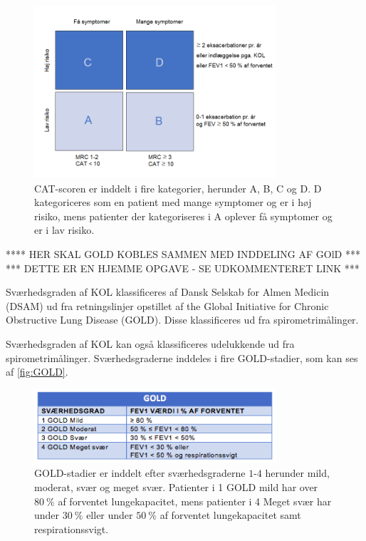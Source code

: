 \begin{figure} [H]
\centering
\includegraphics[width=0.8\textwidth]{figures/CAT}
\caption{CAT-scoren er inddelt i fire kategorier, herunder A, B, C og D. D kategoriceres som en patient med mange symptomer og er i høj risiko, mens patienter der kategoriseres i A oplever få symptomer og er i lav risiko.}
\label{fig:CAT}
\end{figure} 
 
\noindent
**** HER SKAL GOLD KOBLES SAMMEN MED INDDELING AF GOlD ***
*** DETTE ER EN HJEMME OPGAVE - SE UDKOMMENTERET LINK ***

Sværhedsgraden af KOL klassificeres af Dansk Selskab for Almen Medicin (DSAM) ud fra retningslinjer opstillet af the Global Initiative for Chronic Obstructive Lung Disease (GOLD). Disse klassificeres ud fra spirometrimålinger. 

Sværhedsgraden af KOL kan også klassificeres udelukkende ud fra spirometrimålinger. Sværhedsgraderne inddeles i fire GOLD-stadier, som kan ses af \autoref{fig:GOLD}.

\begin{figure} [H]
\centering
\includegraphics[width=0.8\textwidth]{figures/GOLD}
\caption{GOLD-stadier er inddelt efter sværhedsgraderne $1$-$4$ herunder mild, moderat, svær og meget svær. Patienter i 1 GOLD mild har over $80~\%$ af forventet lungekapacitet, mens patienter i 4 Meget svær har under $30~\%$ eller under $50~\%$ af forventet lungekapacitet samt respirationssvigt.}
\label{fig:GOLD}
\end{figure} 

